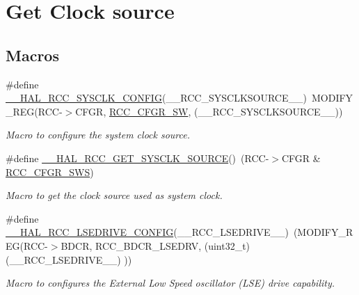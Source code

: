 \hypertarget{group___r_c_c___get___clock__source}{}\section{Get Clock source}
\label{group___r_c_c___get___clock__source}
\subsection*{Macros}
\begin{DoxyCompactItemize}
\item 
\#define \mbox{\hyperlink{group___r_c_c___get___clock__source_ga32f72b8c5b7e97b415867c57f9fafed6}{\+\_\+\+\_\+\+H\+A\+L\+\_\+\+R\+C\+C\+\_\+\+S\+Y\+S\+C\+L\+K\+\_\+\+C\+O\+N\+F\+IG}}(\+\_\+\+\_\+\+R\+C\+C\+\_\+\+S\+Y\+S\+C\+L\+K\+S\+O\+U\+R\+C\+E\+\_\+\+\_\+)~M\+O\+D\+I\+F\+Y\+\_\+\+R\+EG(R\+CC-\/$>$C\+F\+GR, \mbox{\hyperlink{group___peripheral___registers___bits___definition_ga0eea5e5f7743a7e8995b8beeb18355c1}{R\+C\+C\+\_\+\+C\+F\+G\+R\+\_\+\+SW}}, (\+\_\+\+\_\+\+R\+C\+C\+\_\+\+S\+Y\+S\+C\+L\+K\+S\+O\+U\+R\+C\+E\+\_\+\+\_\+))
\begin{DoxyCompactList}\small\item\em Macro to configure the system clock source. \end{DoxyCompactList}\item 
\#define \mbox{\hyperlink{group___r_c_c___get___clock__source_gac99c2453d9e77c8b457acc0210e754c2}{\+\_\+\+\_\+\+H\+A\+L\+\_\+\+R\+C\+C\+\_\+\+G\+E\+T\+\_\+\+S\+Y\+S\+C\+L\+K\+\_\+\+S\+O\+U\+R\+CE}}()~(R\+CC-\/$>$C\+F\+GR \& \mbox{\hyperlink{group___peripheral___registers___bits___definition_ga15bf2269500dc97e137315f44aa015c9}{R\+C\+C\+\_\+\+C\+F\+G\+R\+\_\+\+S\+WS}})
\begin{DoxyCompactList}\small\item\em Macro to get the clock source used as system clock. \end{DoxyCompactList}\item 
\#define \mbox{\hyperlink{group___r_c_c___get___clock__source_ga9e21c193560567cfc3f908d733d9b19b}{\+\_\+\+\_\+\+H\+A\+L\+\_\+\+R\+C\+C\+\_\+\+L\+S\+E\+D\+R\+I\+V\+E\+\_\+\+C\+O\+N\+F\+IG}}(\+\_\+\+\_\+\+R\+C\+C\+\_\+\+L\+S\+E\+D\+R\+I\+V\+E\+\_\+\+\_\+)~(M\+O\+D\+I\+F\+Y\+\_\+\+R\+EG(R\+CC-\/$>$B\+D\+CR, R\+C\+C\+\_\+\+B\+D\+C\+R\+\_\+\+L\+S\+E\+D\+RV, (uint32\+\_\+t)(\+\_\+\+\_\+\+R\+C\+C\+\_\+\+L\+S\+E\+D\+R\+I\+V\+E\+\_\+\+\_\+) ))
\begin{DoxyCompactList}\small\item\em Macro to configures the External Low Speed oscillator (L\+SE) drive capability. \end{DoxyCompactList}\item 

\end{DoxyCompactItemize}
